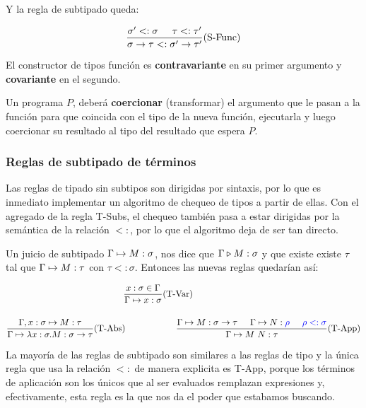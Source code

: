 Y la regla de subtipado queda:

\vspace*{5mm}
$$\frac{\sigma' <: \sigma\hspace*{5mm}\tau <: \tau'}{\sigma\to\tau <: \sigma'\to\tau'}(\text{S-Func})$$

\vspace*{5mm}
El constructor de tipos función es \textbf{contravariante} en su primer argumento y \textbf{covariante} en el segundo.

Un programa $P$, deberá \textbf{coercionar} (transformar) el argumento que le pasan a la función para que coincida con el tipo de la nueva función, ejecutarla y luego coercionar su resultado al tipo del resultado que espera $P$.

\subsubsection{Reglas de subtipado de términos}
Las reglas de tipado sin subtipos son dirigidas por sintaxis, por lo que es inmediato implementar un algoritmo de chequeo de tipos a partir de ellas. Con el agregado de la regla T-Subs, el chequeo también pasa a estar dirigidas por la semántica de la relación $<:$, por lo que el algoritmo deja de ser tan directo.

Un juicio de subtipado $\Gamma\mapsto M : \sigma$, nos dice que $\Gamma\triangleright M : \sigma$ y que existe existe $\tau$ tal que $\Gamma\mapsto M : \tau$ con $\tau <: \sigma$. Entonces las nuevas reglas quedarían así:

\begin{equation*}
\begin{gathered}
    \frac{x:\sigma\in\Gamma}{\judgeTypeS{\Gamma}{x}{\sigma}}(\text{T-Var})\hspace*{2cm}
\vspace*{5mm} \\
    \frac {\judgeTypeS{\Gamma,x:\sigma}{M}{\tau}}
          {\judgeTypeS{\Gamma}{\lambdaAbs{x}{\sigma}{M}}{\sigma\to\tau}}(\text{T-Abs})\hspace*{2cm}
    \frac{\judgeTypeS{\Gamma}{M}{\sigma\to\tau}\hspace*{5mm}\judgeTypeS{\Gamma}{N}{\blue{\rho}}\hspace*{5mm}\blue{\rho <: \sigma}}{\judgeTypeS{\Gamma}{M~N}{\tau}}(\text{T-App})
\end{gathered}
\end{equation*}

La mayoría de las reglas de subtipado son similares a las reglas de tipo y la  única regla que usa la relación $<:$ de manera explicita es T-App, porque los términos de aplicación son los únicos que al ser evaluados remplazan expresiones y, efectivamente, esta regla es la que nos da el poder que estabamos buscando.


